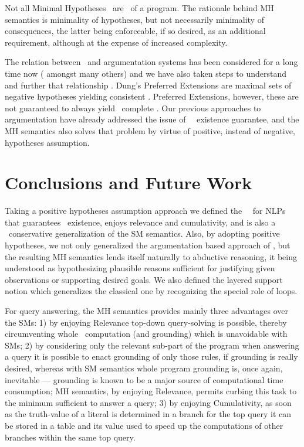 \documentclass{llncs}
\begin{document}
			Not all Minimal Hypotheses \ms\ are \MMs\ of a program.
			The rationale behind MH semantics is minimality of hypotheses, but not necessarily minimality of consequences, the latter being
			enforceable, if so desired, as an additional requirement, although at the expense of increased complexity.
						
			The relation between \lps\ and argumentation systems has been considered for a long time now
			(\cite{dung95acceptability}	
amongst many others)
			and we have also taken steps to understand and further that relationship
			\cite{Pereira:2007fv,lmp:arg07,lmp_amp_oppositional_concepts_chapter}.
			Dung's Preferred Extensions \cite{dung95acceptability} are maximal sets of negative hypotheses yielding consistent \ms.
			Preferred Extensions, however, these are not guaranteed to always yield \twov\ complete \ms.
			Our previous approaches \cite{Pereira:2007fv,lmp:arg07} to argumentation have already addressed the issue of \twov\ \m\ existence
			guarantee, and the MH semantics also solves that problem by virtue of positive, instead of negative, hypotheses assumption.
					


	\section{Conclusions and Future Work}
		Taking a positive hypotheses assumption approach we defined the \twov\ \MHs\ for NLPs that guarantees \m\ existence, enjoys relevance
		and cumulativity, and is also a \m\ conservative generalization of the SM semantics.
		Also, by adopting positive hypotheses, we not only generalized the argumentation based approach of \cite{dung95acceptability}, but the
		resulting MH semantics lends itself naturally to abductive reasoning, it being understood as hypothesizing plausible reasons sufficient for
		justifying given observations or supporting desired goals.
		We also defined the layered support notion which generalizes the classical one by recognizing the special role of loops.
		
		For query answering, the MH semantics provides mainly three advantages over the SMs:
		1) by enjoying Relevance top-down query-solving is possible, thereby circumventing whole \m\ computation (and grounding) which is
		unavoidable with SMs;
		2) by considering only the relevant sub-part of the program when answering a query it is possible to enact grounding of only those rules, if
		grounding is really desired, whereas with SM semantics whole program grounding is, once again, inevitable --- grounding is known to be a
		major source of computational time consumption; MH semantics, by enjoying Relevance, permits curbing this task to the minimum sufficient
		to answer a query;
		3) by enjoying Cumulativity, as soon as the truth-value of a literal is determined in a branch for the top query it can be stored in a table and
		its value used to speed up the computations of other branches within the same top query.
		
\end{document}
